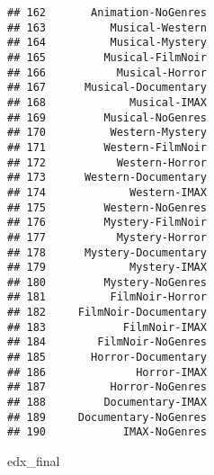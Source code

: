 \documentclass[
]{article}
\newenvironment{Shaded}{\begin{snugshade}}{\end{snugshade}}
\newcommand{\NormalTok}[1]{#1}
\begin{document}
\begin{verbatim}
## 162       Animation-NoGenres
## 163          Musical-Western
## 164          Musical-Mystery
## 165         Musical-FilmNoir
## 166           Musical-Horror
## 167      Musical-Documentary
## 168             Musical-IMAX
## 169         Musical-NoGenres
## 170          Western-Mystery
## 171         Western-FilmNoir
## 172           Western-Horror
## 173      Western-Documentary
## 174             Western-IMAX
## 175         Western-NoGenres
## 176         Mystery-FilmNoir
## 177           Mystery-Horror
## 178      Mystery-Documentary
## 179             Mystery-IMAX
## 180         Mystery-NoGenres
## 181          FilmNoir-Horror
## 182     FilmNoir-Documentary
## 183            FilmNoir-IMAX
## 184        FilmNoir-NoGenres
## 185       Horror-Documentary
## 186              Horror-IMAX
## 187          Horror-NoGenres
## 188         Documentary-IMAX
## 189     Documentary-NoGenres
## 190            IMAX-NoGenres
\end{verbatim}

\begin{Shaded}
\begin{Highlighting}[]
\NormalTok{edx_final}
\end{Highlighting}
\end{Shaded}
\end{document}
